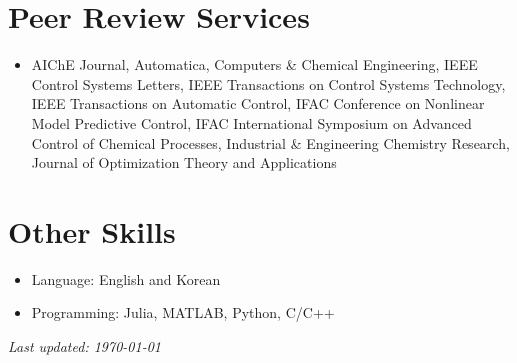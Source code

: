\documentclass{article}
\begin{document}
\section*{Peer Review Services}
\begin{itemize}[leftmargin=*]
\item[] AIChE Journal, Automatica, Computers \& Chemical Engineering, IEEE Control Systems Letters, IEEE Transactions on Control Systems Technology, IEEE Transactions on Automatic Control, IFAC Conference on Nonlinear Model Predictive Control, IFAC International Symposium on Advanced Control of Chemical Processes, Industrial \& Engineering Chemistry Research, Journal of Optimization Theory and Applications
\end{itemize}

\section*{Other Skills}
\begin{itemize}[leftmargin=*]
\item[] Language: English and Korean
\item[] Programming: Julia, MATLAB, Python, C/C++
\end{itemize}

{\noindent\it Last updated: \today}
\end{document}
